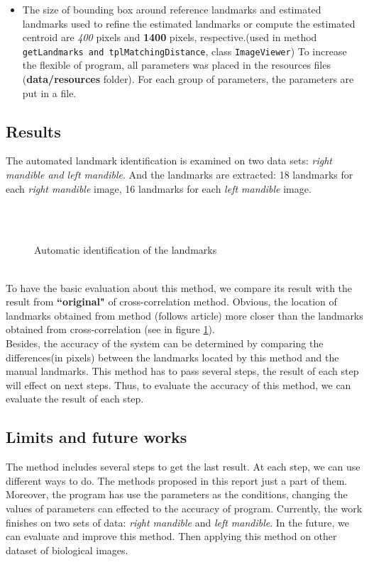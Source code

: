 \begin{itemize}
\item The size of bounding box around reference landmarks and estimated landmarks used to refine the estimated landmarks or compute the estimated centroid are \textit{400} pixels and \textbf{1400} pixels, respective.(used in method \texttt{getLandmarks and tplMatchingDistance}, class \texttt{ImageViewer})
To increase the flexible of program, all parameters was placed in the resources files (\textbf{data/resources} folder). For each group of parameters, the parameters are put in a file.
\end{itemize}
\subsection{Results}
The automated landmark identification is examined on two data sets: \textit{right mandible and left mandible}. And the landmarks are extracted: 18 landmarks for each \textit{right mandible} image, 16 landmarks for each \textit{left mandible} image.\\
\begin{figure}[h!]
\centering
{}\\
~~
\caption{Automatic identification of the landmarks}
\label{fig:46}
\end{figure}~\\
To have the basic evaluation about this method, we compare its result with the result from \textbf{``original"} of cross-correlation method. Obvious, the location of landmarks obtained from method (follows article) more closer than the landmarks obtained from cross-correlation (see in figure \ref{fig:46}).\\
Besides, the accuracy of the system can be determined by comparing the differences(in pixels) between the landmarks located by this method and the manual landmarks. This method has to pass several steps, the result of each step will effect on next steps. Thus, to evaluate the accuracy of this method, we can evaluate the result of each step.
\subsection{Limits and future works}
The method includes several steps to get the last result. At each step, we can use different ways to do. The methods proposed in this report just a part of them. Moreover, the program has use the parameters as the conditions, changing the values of parameters can effected to the accuracy of program.
Currently, the work finishes on two sets of data: \textit{right mandible} and \textit{left mandible}. In the future, we can evaluate and improve this method. Then applying this method on other dataset of biological images.
